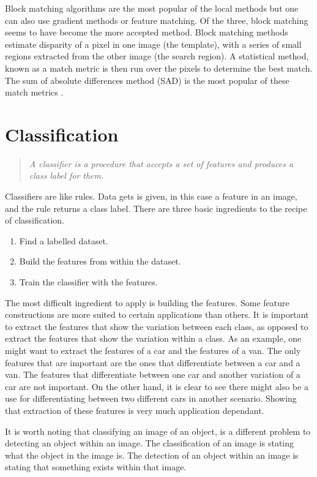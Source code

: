 \documentclass[11pt,oneside]{report}
\begin{document}
					Block matching algorithms are the most popular of the local methods but one can also use gradient methods or feature matching.
					Of the three, block matching seems to have become the more accepted method.
					Block matching methods estimate disparity of a pixel in one image (the template), with a series of small regions extracted from the other image (the search region).
					A statistical method, known as a match metric is then run over the pixels to determine the best match.
					The sum of absolute differences method (SAD) is the most popular of these match metrics \cite{journal:matchers}.
			\section{Classification}
				\begin{quote}
					\textit{A classifier is a procedure that accepts a set of features and produces a class label for them.}
					\cite[p. 487]{book:modern}
				\end{quote}
				Classifiers are like rules. Data gets is given, in this case a feature in an image, and the rule returns a class label.
				There are three basic ingredients to the recipe of classification.
				\begin{enumerate}
					\item{Find a labelled dataset.}
					\item{Build the features from within the dataset.}
					\item{Train the classifier with the features.}
				\end{enumerate}
				The most difficult ingredient to apply is building the features.
				Some feature constructions are more suited to certain applications than others.
				It is important to extract the features that show the variation between each class, as opposed to extract the features that show the variation within a class.
				As an example, one might want to extract the features of a car and the features of a van.
				The only features that are important are the ones that differentiate between a car and a van.
				The features that differentiate between one car and another variation of a car are not important.
				On the other hand, it is clear to see there might also be a use for differentiating between two different cars in another scenario.
				Showing that extraction of these features is very much application dependant.
				
				It is worth noting that classifying an image of an object, is a different problem to detecting an object within an image.
				The classification of an image is stating what the object in the image is.
				The detection of an object within an image is stating that something exists within that image.
\end{document}
